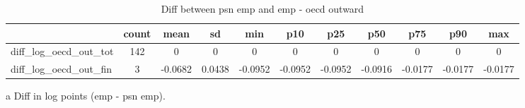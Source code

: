 \begin{table}[h]\scriptsize\caption{Diff between psn emp and emp - oecd outward}\centering
\begin{threeparttable}\begin{tabular}{l*{10}c}\toprule
            &       count&        mean&          sd&         min&         p10&         p25&         p50&         p75&         p90&         max\\
\midrule
diff\_log\_oecd\_out\_tot&         142&           0&           0&           0&           0&           0&           0&           0&           0&           0\\
diff\_log\_oecd\_out\_fin&           3&     -0.0682&      0.0438&     -0.0952&     -0.0952&     -0.0952&     -0.0916&     -0.0177&     -0.0177&     -0.0177\\
\bottomrule\end{tabular}\begin{tablenotes}
\item[a] Diff in log points (emp - psn emp).
\end{tablenotes}\end{threeparttable}\end{table}
